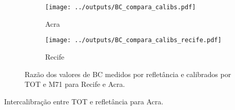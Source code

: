 \begin{figure}[H]
	\centering
	\begin{subfigure}[b]{0.43\linewidth}
		\texttt{[image: ../outputs/BC\_compara\_calibs.pdf]}
		\caption{Acra \label{fig:razaoTOTM71}}
	\end{subfigure}
		\hspace{0.3cm}
	\begin{subfigure}[b]{0.43\linewidth}
		\texttt{[image: ../outputs/BC\_compara\_calibs\_recife.pdf]}
		\caption{Recife \label{fig:BC_compara_recife}}
	\end{subfigure}%

	\caption{Razão dos valores de BC medidos por refletância e calibrados por 
		TOT e M71 para Recife e Acra. \label{fig:BC_compara}}
\end{figure}

\newpage
\begin{table}[H]
	\centering
	\footnotesize 
	\caption{Intercalibração entre TOT e refletância para Acra. \label{table:interGanaBC}} 
	
\end{table} 
\newpage


